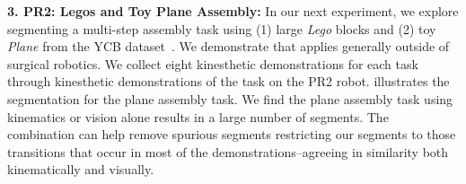 





\vspace{5pt}
\noindent \textbf{3. PR2: Legos and Toy Plane Assembly: }
In our next experiment, we explore segmenting a multi-step assembly task using (1) large \textit{Lego} blocks and (2) toy \textit{Plane} from the YCB dataset~\cite{calli2015corr}. 
We demonstrate that \tsc applies generally outside of surgical robotics.
We collect eight kinesthetic demonstrations for each task through kinesthetic demonstrations of the task on the PR2 robot.
 illustrates the segmentation for the plane assembly task.
We find the plane assembly task using kinematics or vision alone results in a large number of segments.
The combination can help remove spurious segments restricting our segments to those transitions that occur in most of the demonstrations--agreeing in similarity both kinematically and visually.


